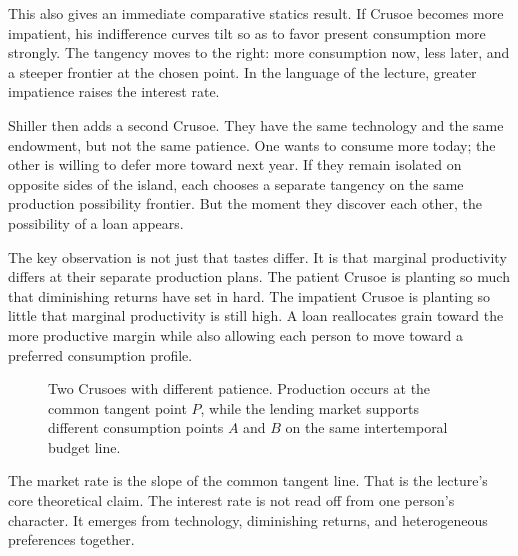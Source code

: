 This also gives an immediate comparative statics result. If Crusoe becomes more impatient, his indifference curves tilt so as to favor present consumption more strongly. The tangency moves to the right: more consumption now, less later, and a steeper frontier at the chosen point. In the language of the lecture, greater impatience raises the interest rate.

Shiller then adds a second Crusoe. They have the same technology and the same endowment, but not the same patience. One wants to consume more today; the other is willing to defer more toward next year. If they remain isolated on opposite sides of the island, each chooses a separate tangency on the same production possibility frontier. But the moment they discover each other, the possibility of a loan appears.

The key observation is not just that tastes differ. It is that marginal productivity differs at their separate production plans. The patient Crusoe is planting so much that diminishing returns have set in hard. The impatient Crusoe is planting so little that marginal productivity is still high. A loan reallocates grain toward the more productive margin while also allowing each person to move toward a preferred consumption profile.

\begin{figure}[t]
\centering
{}
\caption{Two Crusoes with different patience. Production occurs at the common tangent point \(P\), while the lending market supports different consumption points \(A\) and \(B\) on the same intertemporal budget line.}
\end{figure}

The market rate is the slope of the common tangent line. That is the lecture's core theoretical claim. The interest rate is not read off from one person's character. It emerges from technology, diminishing returns, and heterogeneous preferences together.

